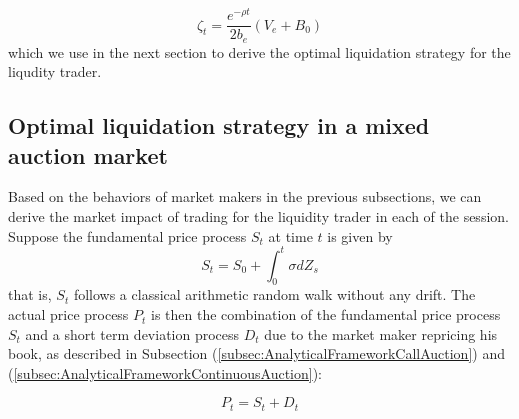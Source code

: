 \documentclass{article}
\begin{document}
\begin{equation}\label{resilence_term}
  \zeta_t = \frac{e^{-\rho t}}{2 b_e}  (V_e + B_0)
\end{equation}
which we use in the next section to derive the optimal liquidation strategy for the liqudity trader.

\subsection{Optimal liquidation strategy in a mixed auction market}

Based on the behaviors of market makers in the previous subsections, we can derive the market impact of trading for the liquidity trader in each of the session. Suppose the fundamental price process $S_t$ at time $t$ is given by
\[
  S_t = S_0 + \int_0^t \sigma dZ_s
\]
that is, $S_t$ follows a classical arithmetic random walk without any drift. The actual price process $P_t$ is then the combination of the fundamental price process $S_t$ and a short term deviation process $D_t$ due to the market maker repricing his book, as described in Subsection (\ref{subsec:AnalyticalFrameworkCallAuction}) and (\ref{subsec:AnalyticalFrameworkContinuousAuction}):

\[
  P_t = S_t + D_t
\]
\end{document}
